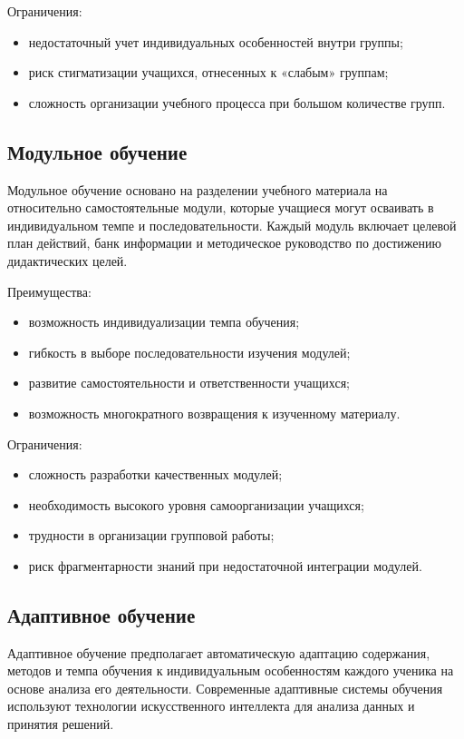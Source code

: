 \documentclass[a4paper,14pt]{extreport}
\begin{document}
Ограничения:
\begin{itemize}
    \item недостаточный учет индивидуальных особенностей внутри группы;
    \item риск стигматизации учащихся, отнесенных к «слабым» группам;
    \item сложность организации учебного процесса при большом количестве групп.
\end{itemize}

\subsection{Модульное обучение}

Модульное обучение основано на разделении учебного материала на относительно самостоятельные модули, которые учащиеся могут осваивать в индивидуальном темпе и последовательности. Каждый модуль включает целевой план действий, банк информации и методическое руководство по достижению дидактических целей.

Преимущества:
\begin{itemize}
    \item возможность индивидуализации темпа обучения;
    \item гибкость в выборе последовательности изучения модулей;
    \item развитие самостоятельности и ответственности учащихся;
    \item возможность многократного возвращения к изученному материалу.
\end{itemize}

Ограничения:
\begin{itemize}
    \item сложность разработки качественных модулей;
    \item необходимость высокого уровня самоорганизации учащихся;
    \item трудности в организации групповой работы;
    \item риск фрагментарности знаний при недостаточной интеграции модулей.
\end{itemize}

\subsection{Адаптивное обучение}

Адаптивное обучение предполагает автоматическую адаптацию содержания, методов и темпа обучения к индивидуальным особенностям каждого ученика на основе анализа его деятельности. Современные адаптивные системы обучения используют технологии искусственного интеллекта для анализа данных и принятия решений.
\end{document}
